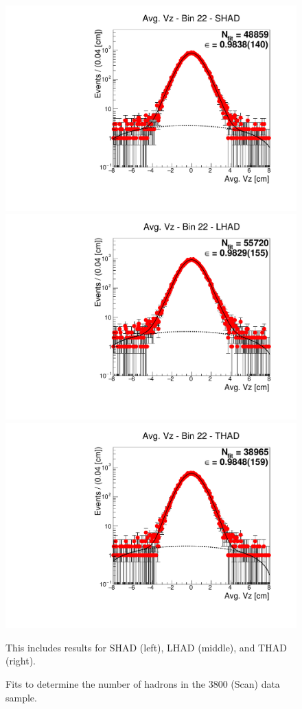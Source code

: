 \begin{figure}[H]
\centering
\includegraphics[scale=0.25]{figures/plots/nonDDbar_fit_results/scan/fit_scan_22_data_SHAD.pdf}
\hspace{-0.5cm}
\includegraphics[scale=0.25]{figures/plots/nonDDbar_fit_results/scan/fit_scan_22_data_LHAD.pdf}
\hspace{-0.5cm}
\includegraphics[scale=0.25]{figures/plots/nonDDbar_fit_results/scan/fit_scan_22_data_THAD.pdf}
\caption{Fits to determine the number of hadrons in the 3800 (Scan) data sample.}
{This includes results for SHAD (left), LHAD (middle), and THAD (right).}
\label{fig:hadron_fits_scan_22}
\end{figure}

